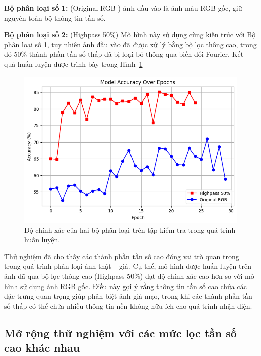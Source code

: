 \textbf{Bộ phân loại số 1:} (Original RGB ) ảnh đầu vào là ảnh màu RGB gốc, giữ nguyên toàn bộ thông tin tần số.  

\textbf{Bộ phân loại số 2:} (Highpass 50\%) Mô hình này sử dụng cùng kiến trúc với Bộ phân loại số 1, tuy nhiên ảnh đầu vào đã được xử lý bằng bộ lọc thông cao, trong đó 50\% thành phần tần số thấp đã bị loại bỏ thông qua biến đổi Fourier. Kết quả huấn luyện được trình bày trong Hình~\ref{fig:Experiment_Highpass50_percent}

%
\begin{figure}[h!]
	\centering
	\includegraphics[width=1.0\linewidth]{Images/Experiment_Highpass50_percent.png}
	\begin{minipage}{1.0\linewidth}
		\caption{Độ chính xác của hai bộ phân loại trên tập kiểm tra trong quá trình huấn luyện.}
		\label{fig:Experiment_Highpass50_percent}
	\end{minipage}
\end{figure}

%
Thử nghiệm đã cho thấy các thành phần tần số cao đóng vai trò quan trọng trong quá trình phân loại ảnh thật – giả. Cụ thể, mô hình được huấn luyện trên ảnh đã qua bộ lọc thông cao (Highpass 50\%) đạt độ chính xác cao hơn so với mô hình sử dụng ảnh RGB gốc. Điều này gợi ý rằng thông tin tần số cao chứa các đặc trưng quan trọng giúp phân biệt ảnh giả mạo, trong khi các thành phần tần số thấp có thể chứa nhiều thông tin nền không hữu ích cho quá trình nhận diện.  

\subsection*{Mở rộng thử nghiệm với các mức lọc tần số cao khác nhau}

